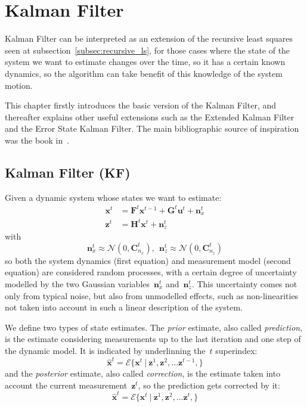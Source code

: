 \section{Kalman Filter}
\label{sec:KalmanFilter}
Kalman Filter can be interpreted as an extension of the recursive least squares seen at subsection~\ref{subsec:recursive_ls}, for those cases where the state of the system we want to estimate changes over the time, so it has a certain known dynamics, so the algorithm can take benefit of this knowledge of the system motion.

This chapter firstly introduces the basic version of the Kalman Filter, and thereafter explains other useful extensions such as the Extended Kalman Filter and the Error State Kalman Filter. The main bibliographic source of inspiration was the book in~\cite{simon06}.

\subsection{Kalman Filter (KF)}
Given a dynamic system whose states we want to estimate:
\begin{align}
\mathbf{x}^t & = \mathbf{F}^t\mathbf{x}^{t-1} + \mathbf{G}^t\mathbf{u}^{t} + \mathbf{n}^t_x \label{eq:dynamic_system_1}\\
\mathbf{z}^t & = \mathbf{H}^t\mathbf{x}^t + \mathbf{n}^t_z \label{eq:dynamic_system_2}
\end{align} 
with 
\begin{equation}
 \mathbf{n}^t_x \approx \mathcal{N}(0,\mathbf{C}^t_{n_x}), \ \ \mathbf{n}^t_z \approx \mathcal{N}(0,\mathbf{C}^t_{n_z})
\end{equation}
so both the system dynamics (first equation) and measurement model (second equation) are considered random processes, with a certain degree of uncertainty modelled by the two Gaussian variables~$\mathbf{n}^t_x$ and~$\mathbf{n}^t_z$. This uncertainty comes not only from typical noise, but also from unmodelled effects, such as non-linearities not taken into account in such a linear description of the system. 

We define two types of state estimates. The \textit{prior} estimate, also called \textit{prediction}, is the estimate considering measurements up to the last iteration and one step of the dynamic model. It is indicated by underlinning the~$t$ superindex:
\begin{equation}
 \hat{\mathbf{x}}^{\underline{t}} = \mathcal{E}\{\mathbf{x}^t\ |\ \mathbf{z}^1,\mathbf{z}^2,\dots \mathbf{z}^{t-1},\}
\end{equation}
and the \textit{posterior} estimate, also called \textit{correction}, is the estimate taken into account the current measurement~$\mathbf{z}^{t}$, so the prediction gets corrected by it:
\begin{equation}
 \hat{\mathbf{x}}^{t} = \mathcal{E}\{\mathbf{x}^t\ |\ \mathbf{z}^1,\mathbf{z}^2,\dots \mathbf{z}^{t},\}
\end{equation}

